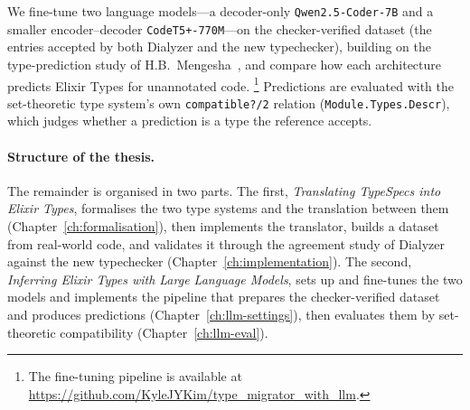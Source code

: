 \begin{itemize}
    We fine-tune two language models---a decoder-only \texttt{Qwen2.5-Coder-7B} and a smaller encoder--decoder \texttt{CodeT5+-770M}---on the checker-verified dataset (the entries accepted by both Dialyzer and the new typechecker), building on the type-prediction study of H.B.~Mengesha~\cite{Nina}, and compare how each architecture predicts Elixir Types for unannotated code.
    \footnote{The fine-tuning pipeline is available at \url{https://github.com/KyleJYKim/type_migrator_with_llm}.}
    Predictions are evaluated with the set-theoretic type system's own \texttt{compatible?/2} relation (\texttt{Module.Types.Descr}), which judges whether a prediction is a type the reference accepts.
\end{itemize}

\paragraph{Structure of the thesis.}
The remainder is organised in two parts.
The first, \emph{Translating TypeSpecs into Elixir Types}, formalises the two type systems and the translation between them (Chapter~\ref{ch:formalisation}), then implements the translator, builds a dataset from real-world code, and validates it through the agreement study of Dialyzer against the new typechecker (Chapter~\ref{ch:implementation}).
The second, \emph{Inferring Elixir Types with Large Language Models}, sets up and fine-tunes the two models and implements the pipeline that prepares the checker-verified dataset and produces predictions (Chapter~\ref{ch:llm-settings}), then evaluates them by set-theoretic compatibility (Chapter~\ref{ch:llm-eval}).
